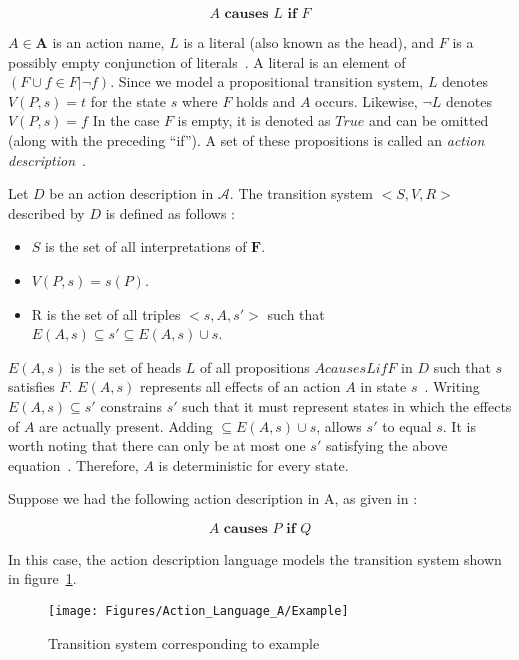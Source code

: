 $$
A \textbf{ causes } L \textbf{ if } F
$$

$ A \in \boldsymbol{A} $ is an action name, $ L $ is a literal (also known as the head), and $ F $ is a possibly empty conjunction of literals~\cite{gelfond_action_1998}.
A literal is an element of $(F \cup {f \in F | \neg f})$.
Since we model a propositional transition system, $L$ denotes $V(P, s) = t$ for the state $s$ where $F$ holds and $A$ occurs.
Likewise, $\neg L$ denotes $V(P, s)=f$
In the case $ F $ is empty, it is denoted as $ True $ and can be omitted (along with the preceding ``if'').
A set of these propositions is called an \textit{action description}~\cite{gelfond_action_1998}.

\begin{definition}
    Let $ D $ be an action description in $ \mathcal{A} $.
    The transition system $ <S, V, R> $ described by $ D $ is defined as follows \cite{gelfond_action_1998}:

    \begin{itemize}
        \item $ S $ is the set of all interpretations of $ \boldsymbol{F} $.
        \item $ V(P, s) = s(P) $.
        \item R is the set of all triples $ <s, A, s'> $ such that $ E(A,s) \subseteq s' \subseteq E(A,s) \cup s $.
    \end{itemize}
\end{definition}

$ E(A, s) $ is the set of heads $ L $ of all propositions $ A causes L if F $ in $ D $ such that $ s $ satisfies $ F $.
$ E(A, s) $ represents all effects of an action $ A $ in state $ s $~\cite{gelfond_action_1998}.
Writing $ E\left(A,s\right)\subseteq s' $ constrains $ s' $ such that it must represent states in which the effects of $ A $ are actually present.
Adding $ \subseteq E\left(A,s\right)\cup s $, allows $ s' $ to equal $ s $.
It is worth noting that there can only be at most one $ s' $ satisfying the above equation~\cite{gelfond_action_1998}.
Therefore, $ A $ is deterministic for every state.

Suppose we had the following action description in A, as given in \cite{gelfond_action_1998}:

$$
A \textbf{ causes } P \textbf{ if } Q
$$

In this case, the action description language models the transition system shown in figure~\ref{fig:action_language_a_example}.

\begin{figure}[h]
    \centering
    \texttt{[image: Figures/Action\_Language\_A/Example]}
    \caption{Transition system corresponding to example}
    \label{fig:action_language_a_example}
\end{figure}

